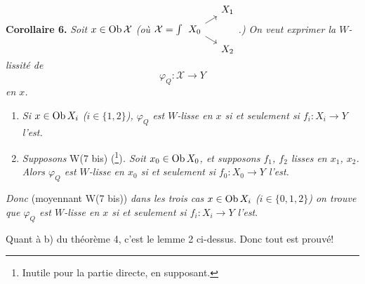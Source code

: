 \textbf{Corollaire 6.} \textit{Soit $x \in \operatorname{Ob} \mathcal{X}$ (où $\mathcal{X} = \int \begin{tikzcd}[ampersand replacement=\&, row sep=tiny, column sep=small, baseline=(\tikzcdmatrixname-2-1.base)] \& X_1 \\ X_0 \ar[ur]\ar[dr] \& \\ \& X_2 \end{tikzcd}$.) On veut exprimer la $W$-lissité de}
\[
\varphi_Q : \mathcal{X} \longrightarrow Y
\]
\textit{en $x$.}

\begin{enumerate}[label={}, leftmargin=2.5em]
\item[\textit{a)}] \textit{Si $x \in \operatorname{Ob} X_i$ ($i \in \{1,2\}$), $\varphi_Q$ est $W$-lisse en $x$ si et seulement si $f_i : X_i \longrightarrow Y$ l'est.}
\item[\textit{b)}] \textit{Supposons} \textup{W(7 bis)} (\footnote[108]{Inutile pour la partie directe, en supposant.})\textit{. Soit $x_0 \in \operatorname{Ob} X_0$, et supposons $f_1$, $f_2$ lisses en $x_1$, $x_2$. Alors $\varphi_Q$ est $W$-lisse en $x_0$ si et seulement si $f_0 : X_0 \longrightarrow Y$ l'est.}
\end{enumerate}

\textit{Donc} (moyennant W(7 bis)) \textit{dans les trois cas $x \in \operatorname{Ob} X_i$ ($i \in \{0,1,2\}$) on trouve que $\varphi_Q$ est $W$-lisse en $x$ si et seulement si $f_i : X_i \longrightarrow Y$ l'est}.

 Quant à b) du théorème 4, c'est le lemme 2 ci-dessus. Donc tout est prouvé!


